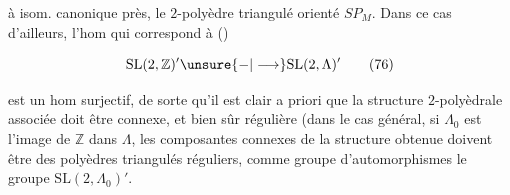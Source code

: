 
à isom. canonique près,  le $2$-polyèdre triangulé orienté $SP_M$. Dans ce cas d'ailleurs, l'hom qui correspond à ()

\[
\mathrm{SL}(2,\mathbb{Z})'\unsure{\mathbin{-}|\longrightarrow}\mathrm{SL}(2,\Lambda)'\tag*{(76)}
\]


est un hom surjectif, de sorte qu'il est clair a priori que la structure $2$-polyèdrale associée doit être connexe, et bien sûr régulière (dans le cas général, si $\Lambda_0$ est l'image de $\mathbb{Z}$ dans $\Lambda$, les composantes connexes de la structure obtenue doivent être des polyèdres triangulés réguliers,     comme groupe d'automorphismes  le groupe $\mathrm{SL}(2,\Lambda_0)'$.

